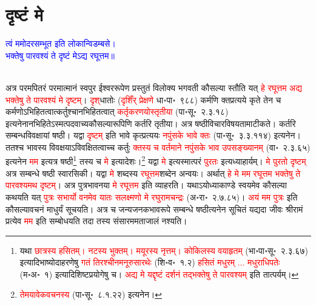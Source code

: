\section[दृष्टं मे]{दृष्टं मे}
\centering\textcolor{blue}{त्वं ममोदरसम्भूत इति लोकान्विडम्बसे।\nopagebreak\\
भक्तेषु पारवश्यं ते दृष्टं मेऽद्य रघूत्तम॥}\nopagebreak\\
\\
\begin{sloppypar}\justifying\noindent\hspace{10mm} अत्र परम\-पितरं परमात्मानं स्वपुर ईश्वर\-रूपेण प्रस्तुतं विलोक्य भगवती कौसल्या स्तौति यत् \textcolor{red}{हे रघूत्तम अद्य भक्तेषु ते पारवश्यं मे दृष्टम्‌}। \textcolor{red}{दृश्‌}\-धातोः (\textcolor{red}{दृशिँर् प्रेक्षणे} धा॰पा॰~९८८) कर्मणि क्त\-प्रत्यये कृते तेन च कर्मणोऽभिहितत्वात्कर्तुश्चानभिहितत्वात् \textcolor{red}{कर्तृ\-करणयोस्तृतीया} (पा॰सू॰~२.३.१८) इत्यनेनानभिहितेऽस्मत्पद\-वाच्य\-कौसल्या\-रूपिणि कर्तरि तृतीया। अत्र षष्ठी\-विचार\-विषयतामाटीकते। कर्तरि सम्बन्ध\-विवक्षायां षष्ठी। यद्वा \textcolor{red}{दृष्टम्‌} इति भावे कृत्प्रत्ययः \textcolor{red}{नपुंसके भावे क्तः} (पा॰सू॰~३.३.११४) इत्यनेन। ततश्च भावस्य विवक्षयाऽविवक्षितत्वाच्च कर्तुः \textcolor{red}{क्तस्य च वर्तमाने नपुंसके भाव उपसङ्ख्यानम्‌} (वा॰~२.३.६५) इत्यनेन \textcolor{red}{मम} इत्यत्र षष्ठी\footnote{यथा \textcolor{red}{छात्रस्य हसितम्‌। नटस्य भुक्तम्‌। मयूरस्य नृत्तम्‌। कोकिलस्य वयाहृतम्‌} (भा॰पा॰सू॰~२.३.६७) इत्यादि\-भाष्योदाहरणेषु \textcolor{red}{गतं तिरश्चीनमनूरुसारथेः} (शि॰व॰~१.२) \textcolor{red}{हसितं मधुरम् ... मधुराधिपतेः} (म॰अ॰~१) इत्यादि\-शिष्ट\-प्रयोगेषु च। \textcolor{red}{अद्य मे यद्दृष्टं दर्शनं तद्भक्तेषु ते पारवश्यम्‌} इति तात्पर्यम्।} तस्य च \textcolor{red}{मे} इत्यादेशः।\footnote{\textcolor{red}{तेमयावेकवचनस्य} (पा॰सू॰~८.१.२२) इत्यनेन।} यद्वा \textcolor{red}{मे} इत्यस्मात्परं \textcolor{red}{पुरतः} इत्यध्याहार्यम्। \textcolor{red}{मे पुरतो दृष्टम्‌} अत्र सम्बन्धे षष्ठी स्वारसिकी। यद्वा \textcolor{red}{मे} शब्दस्य \textcolor{red}{रघूत्तम}\-शब्देन अन्वयः। अर्थात् \textcolor{red}{हे मे मम रघूत्तम भक्तेषु ते पारवश्यमथ दृष्टम्‌}। अत्र पुत्र\-भावनया \textcolor{red}{मे रघूत्तम} इति व्याहरति। यथाऽयोध्या\-काण्डे स्वयमेव कौसल्या कथयति यत् \textcolor{red}{पुत्रः सभार्यो वनमेव यातः सलक्ष्मणो मे रघुरामचन्द्रः} (अ॰रा॰~२.७.८५)। \textcolor{red}{अयं मम पुत्रः} इति कौसल्या\-वचनं माधुर्यं सूचयति। अत्र च जन्य\-जनक\-भाव\-रूपे सम्बन्धे षष्ठीत्यनेन सूचितं यद्यदा जीवः श्रीरामं प्रत्येव \textcolor{red}{मम} इति सम्बोधयति तदा तस्य संसार\-ममता\-जालं नश्यति।\end{sloppypar}
